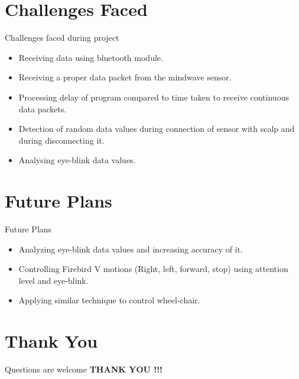 \documentclass[10pt, a4paper]{beamer}
\begin{document}
\section{Challenges Faced}
\begin{frame}{Challenges faced during project}
	\begin{itemize}
		\item Receiving data using bluetooth module.
		\item Receiving a proper data packet from the mindwave sensor.
		\item Processing delay of program compared to time taken to receive continuous data packets.
		\item Detection of random data values during connection of sensor with scalp and during disconnecting it.
		\item Analysing eye-blink data values.   
	\end{itemize}
\end{frame}

\section{Future Plans}
\begin{frame}{Future Plans}
	\begin{itemize}
		\item Analyzing eye-blink data values and increasing accuracy of it.
		\item Controlling Firebird V motions (Right, left, forward, stop) using attention level and eye-blink.
		\item Applying similar technique to control wheel-chair.
	\end{itemize}
\end{frame}


\section{Thank You}
\begin{frame}{Questions are welcome}
	\centering \textbf{THANK YOU !!!}
\end{frame}
\end{document}
